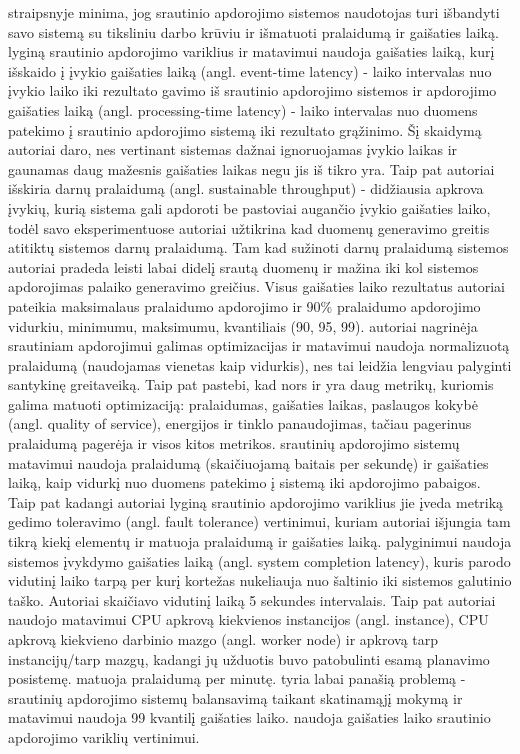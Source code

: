 \documentclass{VUMIFPSbakalaurinis}
\begin{document}
\cite{stonebraker20058} straipsnyje minima, jog srautinio apdorojimo sistemos naudotojas turi išbandyti savo sistemą su tiksliniu darbo krūviu ir išmatuoti pralaidumą ir gaišaties laiką. \cite{Karimov2018BenchmarkingDS} lyginą srautinio apdorojimo variklius ir matavimui naudoja gaišaties laiką, kurį išskaido į įvykio gaišaties laiką (angl. event-time latency) - laiko intervalas nuo įvykio laiko iki rezultato gavimo iš srautinio apdorojimo sistemos ir apdorojimo gaišaties laiką (angl. processing-time latency) - laiko intervalas nuo duomens patekimo į srautinio apdorojimo sistemą iki rezultato grąžinimo. Šį skaidymą autoriai daro, nes vertinant sistemas dažnai ignoruojamas įvykio laikas ir gaunamas daug mažesnis gaišaties laikas negu jis iš tikro yra. Taip pat autoriai išskiria darnų pralaidumą (angl. sustainable throughput) - didžiausia apkrova įvykių, kurią sistema gali apdoroti be pastoviai augančio įvykio gaišaties laiko, todėl savo eksperimentuose autoriai užtikrina kad duomenų generavimo greitis atitiktų sistemos darnų pralaidumą. Tam kad sužinoti darnų pralaidumą sistemos autoriai pradeda leisti labai didelį srautą duomenų ir mažina iki kol sistemos apdorojimas palaiko generavimo greičius. Visus gaišaties laiko rezultatus autoriai pateikia maksimalaus pralaidumo apdorojimo ir 90\% pralaidumo apdorojimo vidurkiu, minimumu, maksimumu, kvantiliais (90, 95, 99). \cite{hirzel2014catalog} autoriai nagrinėja srautiniam apdorojimui galimas optimizacijas ir matavimui naudoja normalizuotą pralaidumą (naudojamas vienetas kaip vidurkis), nes tai leidžia lengviau palyginti santykinę greitaveiką. Taip pat \cite{hirzel2014catalog} pastebi, kad nors ir yra daug metrikų, kuriomis galima matuoti optimizaciją: pralaidumas, gaišaties laikas, paslaugos kokybė (angl. quality of service), energijos ir tinklo panaudojimas, tačiau pagerinus pralaidumą pagerėja ir visos kitos metrikos. \cite{Qian2016Benchmarking} srautinių apdorojimo sistemų matavimui naudoja pralaidumą (skaičiuojamą baitais per sekundę) ir gaišaties laiką, kaip vidurkį nuo duomens patekimo į sistemą iki apdorojimo pabaigos. Taip pat kadangi autoriai lyginą srautinio apdorojimo variklius jie įveda metriką gedimo toleravimo (angl. fault tolerance) vertinimui, kuriam autoriai išjungia tam tikrą kiekį elementų ir matuoja pralaidumą ir gaišaties laiką. \cite{zhang2020heron} palyginimui naudoja sistemos įvykdymo gaišaties laiką (angl. system completion latency), kuris parodo vidutinį laiko tarpą per kurį kortežas nukeliauja nuo šaltinio iki sistemos galutinio taško. Autoriai skaičiavo vidutinį laiką 5 sekundes intervalais. Taip pat autoriai naudojo matavimui CPU apkrovą kiekvienos instancijos (angl. instance), CPU apkrovą kiekvieno darbinio mazgo (angl. worker node) ir apkrovą tarp instancijų/tarp mazgų, kadangi jų užduotis buvo patobulinti esamą planavimo posistemę.  \cite{dhalion} matuoja pralaidumą per minutę. \cite{vaquero2018autotuning} tyria labai panašią problemą - srautinių apdorojimo sistemų balansavimą taikant skatinamąjį mokymą ir matavimui naudoja 99 kvantilį gaišaties laiko. \cite{Chintapalli2016Benchmarking} naudoja gaišaties laiko srautinio apdorojimo variklių vertinimui.
\end{document}
